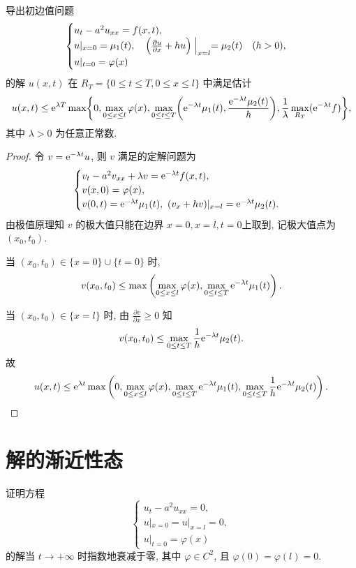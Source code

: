 \begin{exercise}
  导出初边值问题
  \[\begin{cases}
    u_t - a^2 u_{xx} = f(x,t), \\
    u|_{x=0} = \mu_1(t),\quad
      \Bigl(\frac{\partial u}{\partial x} + hu\Bigr)\Bigm|_{x=l} = \mu_2(t)\quad (h>0), \\
    u|_{t=0} = \varphi(x)
  \end{cases}\]
  的解 $u(x,t)$ 在 $R_T=\{0\leq t\leq T, 0\leq x\leq l\}$ 中满足估计
  \[u(x,t) \leq \mathrm{e}^{\lambda T} \max\biggl\{
    0, \max_{0\leq x\leq l} \varphi(x),
    \max_{0\leq t\leq T} \biggl(\mathrm{e}^{-\lambda t}\mu_1(t),
      \frac{\mathrm{e}^{-\lambda t}\mu_2(t)}{h}\biggr),
      \frac{1}{\lambda} \max_{R_T} (\mathrm{e}^{-\lambda t}f)
  \biggr\},\]
  其中 $\lambda>0$ 为任意正常数.
\end{exercise}

\begin{proof}
  令 $v = \mathrm{e}^{-\lambda t}u$, 则 $v$ 满足的定解问题为
  \[\begin{cases}
    v_t-a^2v_{xx}+\lambda v = \mathrm{e}^{-\lambda t}f(x,t), \\
    v(x,0) = \varphi(x), \\
    v(0,t) = \mathrm{e}^{-\lambda t}\mu_1(t),\ (v_x+hv)|_{x=l} = \mathrm{e}^{-\lambda t}\mu_2(t).
  \end{cases}\]
  由极值原理知 $v$ 的极大值只能在边界 $x=0,x=l,t=0$上取到, 记极大值点为$(x_0,t_0)$.

  当 $(x_0,t_0)\in\{x=0\}\cup\{t=0\}$ 时,
  \[v(x_0,t_0) \leq \max\left(\max_{0\leq x\leq l} \varphi(x),
    \max_{0\leq t\leq T} \mathrm{e}^{-\lambda t}\mu_1(t)\right).\]

  当 $(x_0,t_0)\in\{x=l\}$ 时,
  由 $\frac{\partial v}{\partial x}\geq 0$ 知
  \[v(x_0,t_0)\leq\max_{0\leq t\leq T} \frac{1}{h} \mathrm{e}^{-\lambda t}\mu_2(t).\]
  故
  \[u(x,t)\leq \mathrm{e}^{\lambda t}\max\left(0,\max_{0\leq x\leq l}\varphi(x),
    \max_{0\leq t\leq T} \mathrm{e}^{-\lambda t}\mu_1(t),
    \max_{0\leq t\leq T} \frac{1}{h} \mathrm{e}^{-\lambda t}\mu_2(t)\right). \qedhere\]
\end{proof}


\section{解的渐近性态}

\begin{exercise}
  证明方程
  \[\begin{cases}
    u_t - a^2 u_{xx} = 0, \\
    u|_{x=0} = u|_{x=l} = 0, \\
    u|_{t=0} = \varphi(x)
  \end{cases}\]
  的解当 $t\to +\infty$ 时指数地衰减于零, 其中 $\varphi\in C^2$,
  且 $\varphi(0) = \varphi(l) = 0$.
\end{exercise}

